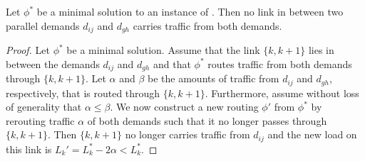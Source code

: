 \begin{theorem}
	\label{theo:parallel-demands-non-crossing}
	Let $\phi^\ast$ be a minimal solution to an instance of \RRL.
	Then no link in between two parallel demands $d_{ij}$ and $d_{gh}$ carries traffic from both demands.
\end{theorem}
\begin{proof}
	Let $\phi^\ast$ be a minimal solution.
	Assume that the link $\{k, k+1\}$ lies in between the demands $d_{ij}$ and $d_{gh}$ and that $\phi^\ast$ routes traffic from both demands through $\{k, k+1\}$.
	Let $\alpha$ and $\beta$ be the amounts of traffic from $d_{ij}$ and $d_{gh}$, respectively, that is routed through $\{k, k+1\}$.
	Furthermore, assume without loss of generality that $\alpha \leq \beta$.
	We now construct a new routing $\phi'$ from $\phi^\ast$ by rerouting traffic $\alpha$ of both demands such that it no longer passes through $\{k, k+1\}$.
	Then $\{k, k+1\}$ no longer carries traffic from $d_{ij}$ and the new load on this link is $L_k' = L_k^\ast - 2 \alpha < L_k^\ast$.
	
	
	

\end{proof}
